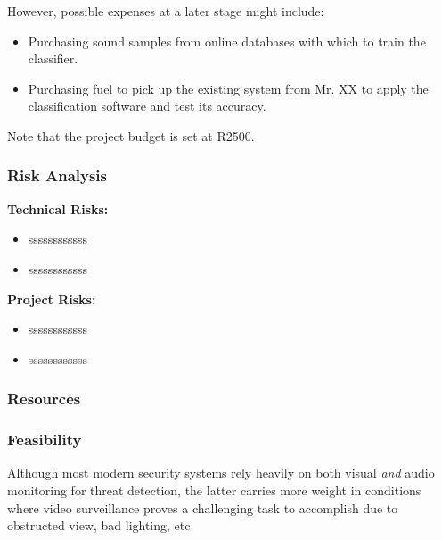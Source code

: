 \documentclass[a4paper,12pt]{article}
\numberwithin{equation}{section}
\numberwithin{figure}{section}
\numberwithin{table}{section}
\begin{document}
However, possible expenses at a later stage might include:
\begin{itemize}
    \item Purchasing sound samples from online databases with which to train the classifier.
    \item Purchasing fuel to pick up the existing system from Mr. XX to apply the classification software and test its accuracy.
\end{itemize}

Note that the project budget is set at R2500.

\subsubsection{Risk Analysis} %
\textbf{Technical Risks:}
\begin{itemize}
    \item ssssssssssss
    \item ssssssssssss
\end{itemize}

\textbf{Project Risks:}
\begin{itemize}
    \item ssssssssssss
    \item ssssssssssss
\end{itemize}



\subsubsection{Resources} %

\subsubsection{Feasibility} %


Although most modern security systems rely heavily on both visual \textit{and} audio monitoring for threat detection, the latter carries more weight in conditions where video surveillance proves a challenging task to accomplish due to obstructed view, bad lighting, etc.
\end{document}
